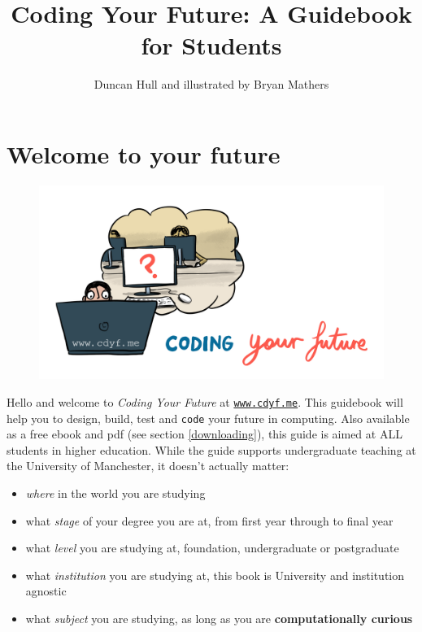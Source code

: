 \documentclass[
]{book}
\title{Coding Your Future: A Guidebook for Students}
\author{Duncan Hull and illustrated by Bryan Mathers}
\date{}
\providecommand{\tightlist}{%
  \setlength{\itemsep}{0pt}\setlength{\parskip}{0pt}}
\begin{document}
\maketitle

{
\setcounter{tocdepth}{1}
\tableofcontents
}
\hypertarget{welcome}{%
\chapter*{Welcome to your future}\label{welcome}}

\begin{figure}

{\centering \includegraphics[width=1\linewidth]{images/Coding-your-Future-CDYF} 

}

\end{figure}

Hello and welcome to \emph{Coding Your Future} at \href{https://www.cdyf.me}{\texttt{www.cdyf.me}}. This guidebook will help you to design, build, test and \texttt{code} your future in computing. Also available as a free ebook and pdf (see section \ref{downloading}), this guide is aimed at ALL students in higher education. While the guide supports undergraduate teaching at the University of Manchester, it doesn't actually matter:

\begin{itemize}
\tightlist
\item
  \emph{where} in the world you are studying
\item
  what \emph{stage} of your degree you are at, from first year through to final year
\item
  what \emph{level} you are studying at, foundation, undergraduate or postgraduate
\item
  what \emph{institution} you are studying at, this book is University and institution agnostic
\item
  what \emph{subject} you are studying, as long as you are \textbf{computationally curious}
\end{itemize}
\end{document}
